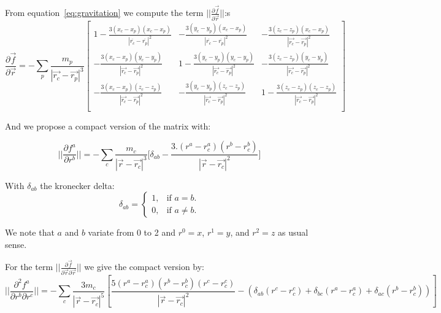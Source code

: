  From equation~\ref{eq:gravitation} we compute the term $||\frac{\partial\vec{f}}{\partial\vec{r}}||$:s
 \begin{equation}
\frac{\partial\vec{f}}{\partial\vec{r}} =
- \sum_p \frac{m_p}{|\vec{r_c}-\vec{r_p}|^3}
\begin{bmatrix}
1 - \frac{3(x_c-x_p)(x_c-x_p)}{|\overline{r_c}-\overline{r_p}|^2} & -\frac{3(y_c-y_p)(x_c-x_p)}{|\overline{r_c}-\overline{r_p}|^2}  & -\frac{3(z_c-z_p)(x_c-x_p)}{|\vec{r_c}-\vec{r_p}|^2}  \\
-\frac{3(x_c-x_p)(y_c-y_p)}{|\vec{r_c}-\vec{r_p}|^2}  & 1 - \frac{3(y_c-y_p)(y_c-y_p)}{|\vec{r_c}-\vec{r_p}|^2} &  -\frac{3(z_c-z_p)(y_c-y_p)}{|\vec{r_c}-\vec{r_p}|^2}\\
- \frac{3(x_c-x_p)(z_c-z_p)}{|\vec{r_c}-\vec{r_p}|^2}   &  -\frac{3(y_c-y_p)(z_c-z_p)}{|\vec{r_c}-\vec{r_p}|^2} &  1- \frac{3(z_c-z_p)(z_c-z_p)}{|\vec{r_c}-\vec{r_p}|^2} \\
\end{bmatrix}
 \end{equation}

And we propose a compact version of the matrix with: 
 
\begin{equation}
 ||\frac{\partial f^a}{\partial r^b}|| = -\sum_c \frac{m_c}{|\vec{r}-\vec{r_c}|^3} \Big[ \delta_{ab} - \frac{3.(r^a-r_c^a)(r^b-r_c^b)}{|\vec{r}-\vec{r_c}|^2} \Big] 
\end{equation}

With $\delta_{ab}$ the kronecker delta:
\begin{equation}
\delta_{ab} = 
\begin{cases}
    1, & \text{if $a = b$}.\\
    0, & \text{if $a\neq b$}.
  \end{cases}
\end{equation}

We note that $a$ and $b$ variate from 0 to 2 and $r^0=x$, $r^1=y$, and $r^2=z$ as usual sense. 

For the term $||\frac{\partial\vec{f}}{\partial\vec{r} \partial\vec{r}}||$ we give the compact version by:
\begin{equation}
||\frac{\partial^2 f^a}{\partial r^b \partial r^c}|| =
- \sum_c \frac{3 m_c}{|\vec{r}-\vec{r_c}|^5} \left[\frac{5(r^a-r_c^a)(r^b-r_c^b)(r^c-r_c^c)}{|\vec{r}-\vec{r_c}|^2} - \left( \delta_{ab} (r^c-r_c^c)+\delta_{bc} (r^a-r_c^a)+\delta_{ac} (r^b-r_c^b) \right) \right] 
 \end{equation} 

